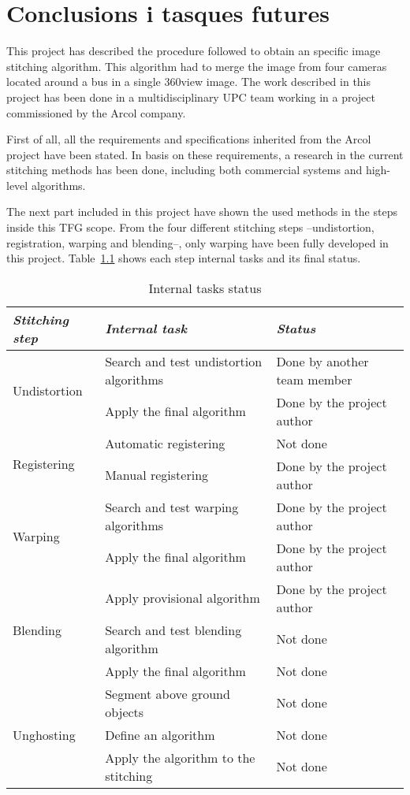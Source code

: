\chapter{Conclusions i tasques futures}

This project has described the procedure followed to obtain an specific image stitching algorithm. This algorithm had to merge the image from four cameras located around a bus in a single 360\degree view image. The work described in this project has been done in a multidisciplinary UPC team working in a project commissioned by the Arcol company.

First of all, all the requirements and specifications inherited from the Arcol project have been stated. In basis on these requirements, a research in the current stitching methods has been done, including both commercial systems and high-level algorithms.

The next part included in this project have shown the used methods in the steps inside this TFG scope. From the four different stitching steps --undistortion, registration, warping and blending--, only warping have been fully developed in this project. Table~\ref{table:mywork} shows each step internal tasks and its final status.

\begin{table}[H]
\begin{tabular}{l l l}

\emph{Stitching step} & \emph{Internal task} & \emph{Status} \\
\hline\hline
\multirow{2}{*}{Undistortion} &Search and test undistortion algorithms& Done by another team member\\
&Apply the final algorithm & Done by the project author \\
\hline
\multirow{2}{*}{Registering} &Automatic registering& Not done\\
&Manual registering&Done by the project author\\
\hline
\multirow{2}{*}{Warping} &Search and test warping algorithms&  Done by the project author \\
&Apply the final algorithm & Done by the project author \\
\hline
\multirow{3}{*}{Blending} &Apply provisional algorithm &Done by the project author \\
&Search and test blending algorithm& Not done\\
&Apply the final algorithm &Not done \\
\hline
\multirow{3}{*}{Unghosting} &Segment above ground objects &Not done \\
&Define an algorithm& Not done\\
&Apply the algorithm to the stitching &Not done \\
\hline
\end{tabular}
\caption{Internal tasks status}
\label{table:mywork}
\end{table}

